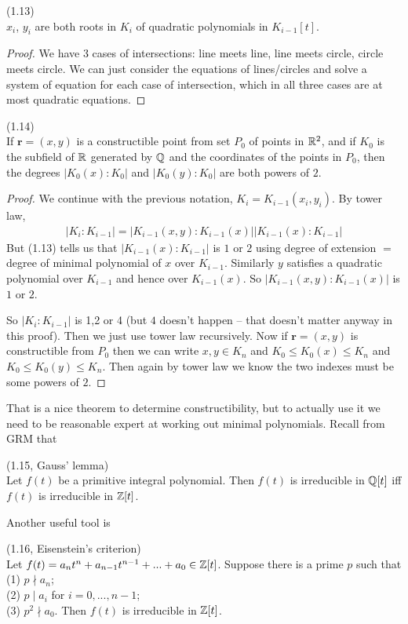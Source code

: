 \documentclass[a4paper]{article}
\begin{document}
\begin{lemma} (1.13)\\
$x_i$, $y_i$ are both roots in $K_i$ of quadratic polynomials in $K_{i-1}[t]$.
\begin{proof}
We have 3 cases of intersections: line meets line, line meets circle, circle meets circle. We can just consider the equations of lines/circles and solve a system of equation for each case of intersection, which in all three cases are at most quadratic equations.
\end{proof}
\end{lemma}

\begin{thm} (1.14)\\
If $\mathbf{r} = (x,y)$ is a constructible point from set $P_0$ of points in $\mathbb{R}^2$, and if $K_0$ is the subfield of $\mathbb{R}$ generated by $\mathbb{Q}$ and the coordinates of the points in $P_0$, then the degrees $|K_0(x):K_0|$ and $|K_0(y):K_0|$ are both powers of $2$.
\begin{proof}
We continue with the previous notation, $K_i = K_{i-1} (x_i,y_i)$. By tower law,
\begin{equation*}
\begin{aligned}
|K_i:K_{i-1}| = |K_{i-1}(x,y):K_{i-1}(x)| |K_{i-1}(x) : K_{i-1}|
\end{aligned}
\end{equation*}
But (1.13) tells us that $|K_{i-1}(x):K_{i-1}|$ is $1$ or $2$ using degree of extension $=$ degree of minimal polynomial of $x$ over $K_{i-1}$. Similarly $y$ satisfies a quadratic polynomial over $K_{i-1}$ and hence over $K_{i-1}(x)$. So $|K_{i-1}(x,y):K_{i-1}(x)|$ is $1$ or $2$.

So $|K_i:K_{i-1}|$ is 1,2 or 4 (but $4$ doesn't happen -- that doesn't matter anyway in this proof). Then we just use tower law recursively. Now if $\mathbf{r}=(x,y)$ is constructible from $P_0$ then we can write $x,y \in K_n$ and $K_0 \leq K_0(x) \leq K_n$ and $K_0 \leq K_0(y) \leq K_n$. Then again by tower law we know the two indexes must be some powers of $2$.
\end{proof}
\end{thm}

That is a nice theorem to determine constructibility, but to actually use it we need to be reasonable expert at working out minimal polynomials. Recall from GRM that

\begin{thm} (1.15, Gauss' lemma)\\
Let $f(t)$ be a primitive integral polynomial. Then $f(t)$ is irreducible in $\mathbb{Q}[t]$ iff $f(t)$ is irreducible in $\mathbb{Z}[t]$.
\end{thm}
Another useful tool is
\begin{thm} (1.16, Eisenstein's criterion)\\
Let $f(t) = a_n t^n + a_{n-1} t^{n-1} + ... + a_0 \in \mathbb{Z}[t]$. Suppose there is a prime $p$ such that\\
(1) $p \nmid a_n$;\\
(2) $p \mid a_i$ for $i=0,...,n-1$;\\
(3) $p^2 \nmid a_0$.
Then $f(t)$ is irreducible in $\mathbb{Z}[t]$.
\end{thm}
\end{document}
